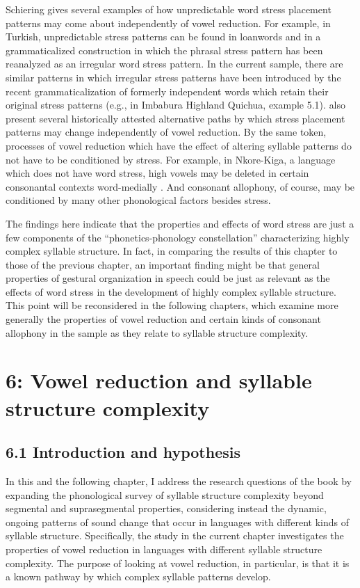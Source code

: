   Schiering gives several examples of how unpredictable word stress placement patterns may come about independently of vowel reduction. For example, in Turkish, unpredictable stress patterns can be found in loanwords and in a grammaticalized construction in which the phrasal stress pattern has been reanalyzed as an irregular word stress pattern. In the current sample, there are similar patterns in which irregular stress patterns have been introduced by the recent grammaticalization of formerly independent words which retain their original stress patterns (e.g., in Imbabura Highland Quichua, example 5.1). \citet{BybeeEtAl1998} also present several historically attested alternative paths by which stress placement patterns may change independently of vowel reduction. By the same token, processes of vowel reduction which have the effect of altering syllable patterns do not have to be conditioned by stress. For example, in Nkore-Kiga, a language which does not have word stress, high vowels may be deleted in certain consonantal contexts word-medially \citep[202-5]{Taylor1985}. And consonant allophony, of course, may be conditioned by many other phonological factors besides stress.



  The findings here indicate that the properties and effects of word stress are just a few components of the “phonetics-phonology constellation” \citep[354]{Schiering2007} characterizing highly complex syllable structure. In fact, in comparing the results of this chapter to those of the previous chapter, an important finding might be that general properties of gestural organization in speech could be just as relevant as the effects of word stress in the development of highly complex syllable structure. This point will be reconsidered in the following chapters, which examine more generally the properties of vowel reduction and certain kinds of consonant allophony in the sample as they relate to syllable structure complexity.


\chapter{6: Vowel reduction and syllable structure complexity}
\section{6.1 Introduction and hypothesis}

  In this and the following chapter, I address the research questions of the book by expanding the phonological survey of syllable structure complexity beyond segmental and suprasegmental properties, considering instead the dynamic, ongoing patterns of sound change that occur in languages with different kinds of syllable structure. Specifically, the study in the current chapter investigates the properties of vowel reduction in languages with different syllable structure complexity. The purpose of looking at vowel reduction, in particular, is that it is a known pathway by which complex syllable patterns develop.



